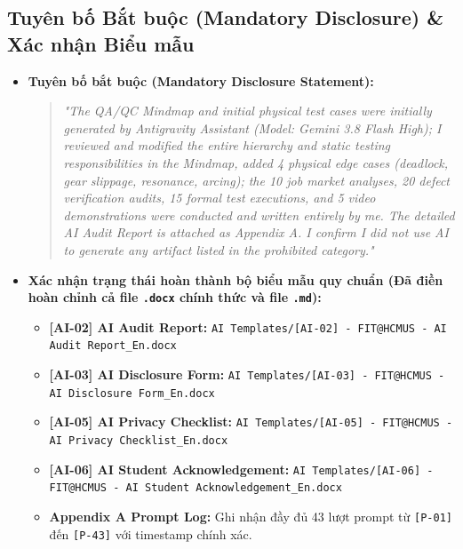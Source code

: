 \documentclass[11pt,a4paper]{article}
\newcommand{\filepath}[1]{\nolinkurl{#1}}
\begin{document}
\subsection{Tuyên bố Bắt buộc (Mandatory Disclosure) \& Xác nhận Biểu mẫu}
\begin{itemize}
    \item \textbf{Tuyên bố bắt buộc (Mandatory Disclosure Statement):}
    \begin{quote}
    \textit{"The QA/QC Mindmap and initial physical test cases were initially generated by Antigravity Assistant (Model: Gemini 3.8 Flash High); I reviewed and modified the entire hierarchy and static testing responsibilities in the Mindmap, added 4 physical edge cases (deadlock, gear slippage, resonance, arcing); the 10 job market analyses, 20 defect verification audits, 15 formal test executions, and 5 video demonstrations were conducted and written entirely by me. The detailed AI Audit Report is attached as Appendix A. I confirm I did not use AI to generate any artifact listed in the prohibited category."}
    \end{quote}
    \item \textbf{Xác nhận trạng thái hoàn thành bộ biểu mẫu quy chuẩn (Đã điền hoàn chỉnh cả file \texttt{.docx} chính thức và file \texttt{.md}):}
    \begin{itemize}
        \item[\checkmark] \textbf{[AI-02] AI Audit Report:} \filepath{AI Templates/[AI-02] - FIT@HCMUS - AI Audit Report_En.docx}
        \item[\checkmark] \textbf{[AI-03] AI Disclosure Form:} \filepath{AI Templates/[AI-03] - FIT@HCMUS - AI Disclosure Form_En.docx}
        \item[\checkmark] \textbf{[AI-05] AI Privacy Checklist:} \filepath{AI Templates/[AI-05] - FIT@HCMUS - AI Privacy Checklist_En.docx}
        \item[\checkmark] \textbf{[AI-06] AI Student Acknowledgement:} \filepath{AI Templates/[AI-06] - FIT@HCMUS - AI Student Acknowledgement_En.docx}
        \item[\checkmark] \textbf{Appendix A Prompt Log:} Ghi nhận đầy đủ 43 lượt prompt từ \texttt{[P-01]} đến \texttt{[P-43]} với timestamp chính xác.
    \end{itemize}
\end{itemize}

\newpage
\end{document}
